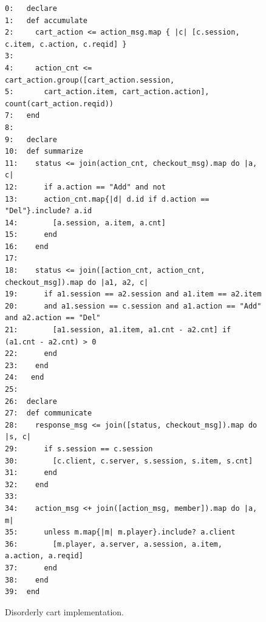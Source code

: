 \begin{figure}[t]
\begin{scriptsize}
\begin{verbatim}
0:   declare
1:   def accumulate
2:     cart_action <= action_msg.map { |c| [c.session, c.item, c.action, c.reqid] }
3:
4:     action_cnt <= cart_action.group([cart_action.session, 
5:       cart_action.item, cart_action.action], count(cart_action.reqid))
7:   end
8:
9:   declare
10:  def summarize
11:    status <= join(action_cnt, checkout_msg).map do |a, c| 
12:      if a.action == "Add" and not 
13:      action_cnt.map{|d| d.id if d.action == "Del"}.include? a.id 
14:        [a.session, a.item, a.cnt] 
15:      end 
16:    end
17:
18:    status <= join([action_cnt, action_cnt, checkout_msg]).map do |a1, a2, c| 
19:      if a1.session == a2.session and a1.item == a2.item 
20:      and a1.session == c.session and a1.action == "Add" and a2.action == "Del"
21:        [a1.session, a1.item, a1.cnt - a2.cnt] if (a1.cnt - a2.cnt) > 0
22:      end
23:    end
24:   end
25:
26:  declare 
27:  def communicate
28:    response_msg <= join([status, checkout_msg]).map do |s, c| 
29:      if s.session == c.session
30:        [c.client, c.server, s.session, s.item, s.cnt]
31:      end
32:    end
33: 
34:    action_msg <+ join([action_msg, member]).map do |a, m|
35:      unless m.map{|m| m.player}.include? a.client
36:        [m.player, a.server, a.session, a.item, a.action, a.reqid]
37:      end 
38:    end
39:  end
\end{verbatim}
\vspace{-10pt}
\caption{Disorderly cart implementation.}
\label{fig:pdg-disorderly}
\end{scriptsize}
\vspace{-2pt}
\end{figure}

